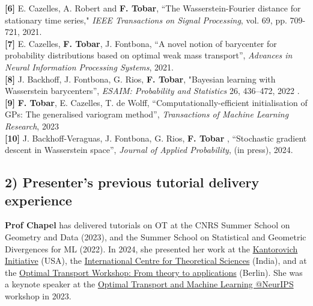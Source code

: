 \documentclass{article}
\begin{document}
\medskip%
\medskip%
\noindent\textbf{[6]} E. Cazelles, A. Robert and \textbf{F. Tobar}, “The Wasserstein-Fourier distance for stationary time series," \emph{IEEE Transactions on Signal Processing}, vol. 69, pp. 709-721, 2021. \\
\textbf{[7]} E. Cazelles, \textbf{F. Tobar}, J. Fontbona, “A novel notion of barycenter for probability distributions based on optimal weak mass transport”, \emph{Advances in Neural Information Processing Systems}, 2021.  \\
\textbf{[8]} J. Backhoff, J. Fontbona, G. Rios, \textbf{F. Tobar}, "Bayesian learning with Wasserstein barycenters”, \emph{ESAIM: Probability and Statistics} 26, 436–472, 2022  . \\
\textbf{[9]} \textbf{F. Tobar}, E. Cazelles, T. de Wolff, “Computationally-efficient initialisation of GPs: The generalised variogram method”, \emph{Transactions of Machine Learning Research}, 2023
 \\
\textbf{[10]} J. Backhoff-Veraguas, J. Fontbona, G. Rios, \textbf{F. Tobar}
, “Stochastic gradient descent in Wasserstein space”, \emph{Journal of Applied Probability}, (in press), 2024.



\subsection*{2) Presenter's previous tutorial delivery experience} 
\textbf{Prof Chapel} has delivered tutorials on OT at the {CNRS Summer School on Geometry and Data} (2023), and the {Summer School on Statistical and Geometric Divergences for ML} (2022). In 2024, she presented her work at the \href{https://kantorovich.org/event/ki-seminar-chapel/}{Kantorovich Initiative} (USA), the \href{https://www.icts.res.in/seminar/2024-04-23/laetitia-chapel}{International Centre for Theoretical Sciences} (India), and at the \href{https://sites.google.com/view/ot-berlin-2024}{Optimal Transport Workshop: From theory to applications} (Berlin). She was a keynote speaker at the \href{https://otmlworkshop.github.io/schedule/}{Optimal Transport and Machine Learning @NeurIPS} workshop in 2023. 
\end{document}
